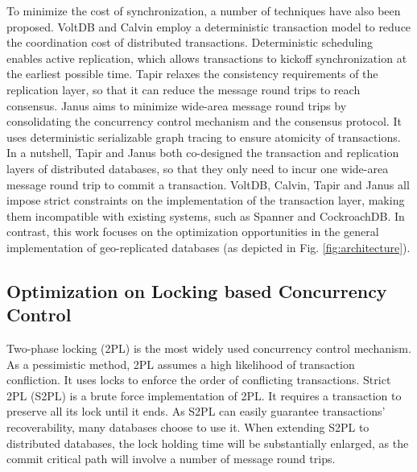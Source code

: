 \documentclass[conference]{IEEEtran}
\begin{document}
To minimize the cost of synchronization, a number of techniques have also been proposed.
VoltDB \cite{VoltDB} and Calvin \cite{Calvin:conf/sigmod/ThomsonDWRSA12} employ a deterministic transaction model
to reduce the coordination cost of distributed transactions.
Deterministic scheduling enables active replication, which allows transactions to kickoff synchronization at the earliest possible time.
Tapir \cite{Tapir:conf/sosp/ZhangSSKP15} relaxes the consistency requirements of the replication layer, so that it can reduce the message round trips to reach consensus.
Janus \cite{Janus:conf/osdi/MuNLL16} aims to minimize wide-area message round trips
by consolidating the concurrency control mechanism and the consensus protocol.
It uses deterministic serializable graph tracing to ensure atomicity of transactions.
In a nutshell, Tapir and Janus both co-designed the transaction and replication layers of distributed databases, so that they only need to incur one wide-area message round trip to commit a transaction.
VoltDB, Calvin, Tapir and Janus all impose strict constraints on the implementation of the transaction layer, making them incompatible with existing systems, such as Spanner and CockroachDB.
In contrast, this work focuses on the optimization opportunities in the general implementation of geo-replicated databases (as depicted in Fig.    \ref{fig:architecture}).

\subsection{Optimization on Locking based Concurrency Control}
Two-phase locking (2PL) is the most widely used concurrency control mechanism.
As a pessimistic method, 2PL assumes a high likelihood of transaction confliction.
It uses locks to enforce the order of conflicting transactions.
Strict 2PL (S2PL) is a brute force implementation of 2PL. 
It requires a transaction to preserve all its lock until it ends.
As S2PL can easily guarantee transactions' recoverability, many databases choose to use it.
When extending S2PL to distributed databases, the lock holding time will be substantially enlarged, 
as the commit critical path will involve a number of message round trips.
\end{document}
